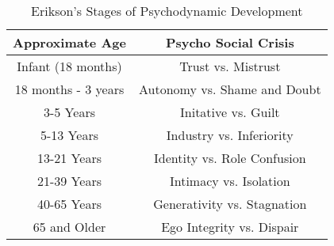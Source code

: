     \begin{table}[htbp]
        \centering
        \begin{tabular}{cc}
            \toprule
            \textbf{Approximate Age} & \textbf{Psycho Social Crisis} \\ \midrule
            Infant (18 months) & Trust vs. Mistrust \\ \midrule
            18 months - 3 years & Autonomy vs. Shame and Doubt \\ \midrule
            3-5 Years & Initative vs. Guilt \\ \midrule
            5-13 Years & Industry vs. Inferiority \\ \midrule
            13-21 Years & Identity vs. Role Confusion \\ \midrule
            21-39 Years & Intimacy vs. Isolation \\ \midrule
            40-65 Years & Generativity vs. Stagnation \\ \midrule
            65 and Older & Ego Integrity vs. Dispair \\
             \bottomrule
        \end{tabular}
        \caption{Erikson's Stages of Psychodynamic Development}\label{tab:erikson}
    \end{table}